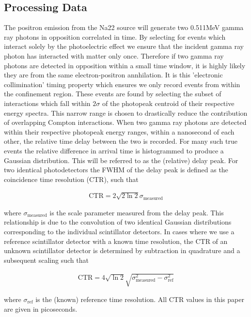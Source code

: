 \subsection{Processing Data}
The positron emission from the Na22 source will generate two 0.511MeV gamma ray photons in opposition correlated in time. By selecting for events which interact solely by the photoelectric effect we ensure that the incident gamma ray photon has interacted with matter only once. Therefore if two gamma ray photons are detected in opposition within a small time window, it is highly likely they are from the same electron-positron annhilation. It is this 'electronic collimination' timing property which ensures we only record events from within the confinement region. These events are found by selecting the subset of interactions which fall within $2\sigma$ of the photopeak centroid of their respective energy spectra. This narrow range is chosen to drastically reduce the contribution of overlapping Compton interactions. When two gamma ray photons are detected within their respective photopeak energy ranges, within a nanosecond of each other, the relative time delay between the two is recorded. For many such true events the relative difference in  arrival time is histogrammed to produce a Gaussian distribution. This will be referred to as the (relative) delay peak. For two identical photodetectors the FWHM of the delay peak is defined as the coincidence time resolution (CTR), such that

\begin{align}
\text{CTR} = 2\sqrt{2\ln{2}}\sigma_\textrm{measured}
\label{eqn:trtoctr}
\end{align}

where $\sigma_\textrm{measured}$ is the scale parameter measured from the delay peak. This relationship is due to the convolution of two identical Gaussian distributions corresponding to the individual scintillator detectors. In cases where we use a reference scintillator detector with a known time resolution, the CTR of an unknown scintillator detector is determined by subtraction in quadrature and a subsequent scaling such that

\begin{align}
\text{CTR} = 4\sqrt{\ln{2}}\sqrt{\sigma_\textrm{measured}^2-\sigma_\textrm{ref}^2}
\end{align}

where $\sigma_\text{ref}$ is the (known) reference time resolution. All CTR values in this paper are given in picoseconds.

